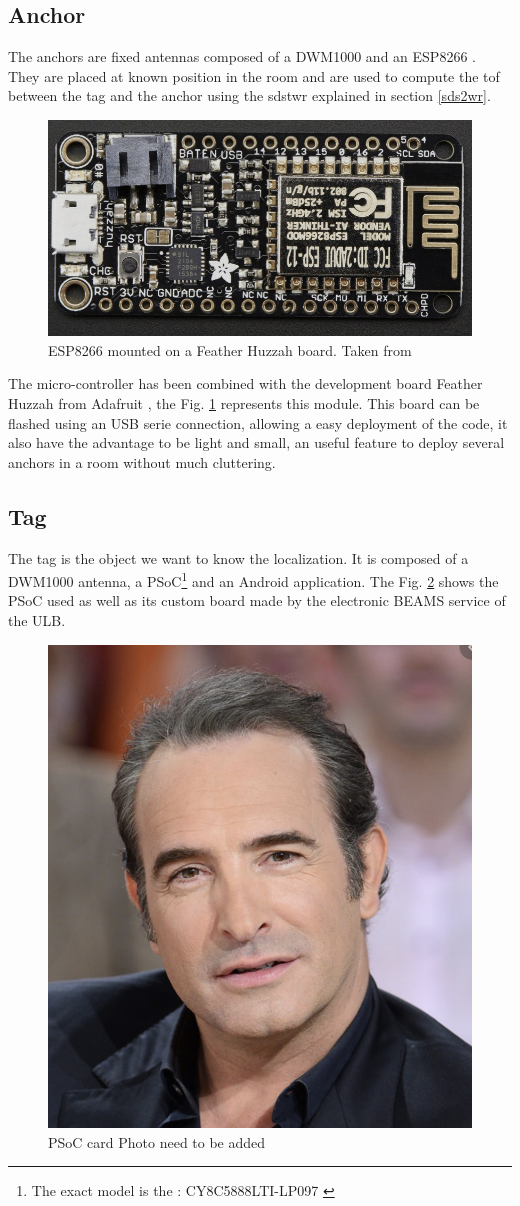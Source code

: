 \subsection{Anchor}

The anchors are fixed antennas composed of a DWM1000 and an ESP8266 \cite{esp8266}. They are placed at known position in the room and are used to compute the \gls{tof} between the tag and the anchor using the \gls{sdstwr} explained in section \ref{sds2wr}. 

\begin{figure}[H]
	\centering
	\includegraphics[width=.6\linewidth]{Images/esp8266.png}
	\caption{ESP8266 mounted on a Feather Huzzah board. Taken from \cite{adafruit}}
	\label{fig:esp8266}
\end{figure}

The micro-controller has been combined with the development board Feather Huzzah from Adafruit \cite{adafruit}, the Fig. \ref{fig:esp8266} represents this module. This board can be flashed using an USB serie connection, allowing a easy deployment of the code, it also have the advantage to be light and small, an useful feature to deploy several anchors in a room without much cluttering.

\subsection{Tag}

The tag is the object we want to know the localization. It is composed of a DWM1000 antenna, a PSoC\footnote{The exact model is the : CY8C5888LTI-LP097 \cite{guyard2019navigation}} and an Android application. The Fig. \ref{fig:psoc} shows the PSoC used as well as its custom board made by the electronic BEAMS service of the ULB.
\vspace{2mm}

\begin{figure}[H]
	\centering
	\includegraphics[width=.2\linewidth]{Images/Temporary_pic.png}
	\caption{PSoC card \color{red} Photo need to be added \color{black}}
	\label{fig:psoc}
\end{figure}


